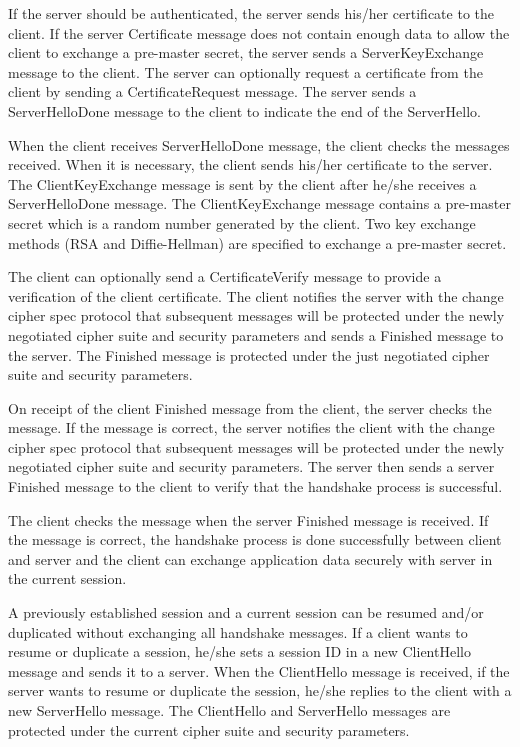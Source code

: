 \documentclass[a4paper,fleqn]{cas-dc}
\begin{document}
If the server should be authenticated, the server sends  his/her certificate to the client. If the server Certificate message does not contain enough data to allow the client to exchange a pre-master secret, the server sends a ServerKeyExchange message to the client. The server can optionally request a certificate from the client by sending a CertificateRequest message. The server sends a ServerHelloDone message to the client to indicate the end of the ServerHello.

When the client receives ServerHelloDone message, the client checks the messages received. When it is necessary, the client sends his/her certificate to the server. The ClientKeyExchange message is sent by the client after he/she receives a ServerHelloDone message. The ClientKeyExchange message contains a pre-master secret which is a random number generated by the client. Two key exchange methods (RSA and Diffie-Hellman) are specified to exchange a pre-master secret. 

The client can optionally send a CertificateVerify message to provide a verification of the client certificate.
The client notifies the server with the change cipher spec protocol that subsequent messages will be protected under the newly negotiated cipher suite and security parameters and sends a Finished message to the server. The Finished message is protected under the just negotiated cipher suite and security parameters.

On receipt of the client Finished message from the client, the server
checks the message. If the message is correct, the server notifies the client with the change cipher spec protocol that subsequent messages will be protected under the newly negotiated cipher suite and security parameters. The server then sends a server Finished message to the client to verify that the handshake process is successful.

The client checks the message when the server Finished message is received. If the message is correct, the handshake process is done successfully between client and server and the client can exchange application data securely with server in the current session.

A previously established session and a current session
can be resumed and/or duplicated without exchanging all handshake messages. If a client wants to resume or duplicate a session, he/she sets a session ID in a new ClientHello message and sends it to a server. When the ClientHello message is received, if the server wants to resume or duplicate the session, he/she replies to the client with a new ServerHello message. The ClientHello and ServerHello messages are protected under the current cipher suite and security parameters. 
\end{document}
